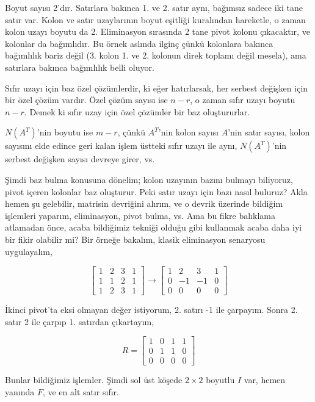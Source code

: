 \documentclass[12pt,fleqn]{article}\usepackage{../../common}
\begin{document}
Boyut sayısı 2'dır. Satırlara bakınca 1. ve 2. satır aynı, bağımsız sadece iki
tane satır var. Kolon ve satır uzaylarının boyut eşitliği kuralından
hareketle, o zaman kolon uzayı boyutu da 2. Eliminasyon sırasında 2 tane
pivot kolonu çıkacaktır, ve kolonlar da bağımlıdır. Bu örnek aslında
ilginç çünkü kolonlara bakınca bağımlılık bariz değil (3. kolon 1. ve
2. kolonun direk toplamı değil mesela), ama satırlara bakınca bağımlılık
belli oluyor.
 
Sıfır uzayı için baz özel çözümlerdir, ki eğer hatırlarsak, her serbest
değişken için bir özel çözüm vardır. Özel çözüm sayısı ise $n-r$, o zaman
sıfır uzayı boyutu $n-r$. Demek ki sıfır uzay için özel çözümler bir baz
oluştururlar. 

$N(A^T)$'nin boyutu ise $m-r$, çünkü $A^T$'nin kolon sayısı $A$'nin satır
sayısı, kolon sayısını elde edince geri kalan işlem üstteki sıfır uzayı ile
aynı, $N(A^T)$'nin serbest değişken sayısı devreye girer, vs. 

Şimdi baz bulma konusuna dönelim; kolon uzayının bazını bulmayı biliyoruz,
pivot içeren kolonlar baz oluşturur. Peki satır uzayı için bazı nasıl
buluruz? Akla hemen şu gelebilir, matrisin devriğini alırım, ve o devrik
üzerinde bildiğim işlemleri yaparım, eliminasyon, pivot bulma, vs. Ama bu
fikre balıklama atlamadan önce, acaba bildiğimiz tekniği olduğu gibi
kullanmak acaba daha iyi bir fikir olabilir mi? Bir örneğe bakalım, klasik
eliminasyon senaryosu uygulayalım,

$$ 
\left[\begin{array}{rrrr}
1 & 2 & 3 & 1 \\
1 & 1 & 2 & 1 \\
1 & 2 & 3 & 1
\end{array}\right] \rightarrow
\left[\begin{array}{rrrr}
1 & 2 & 3 & 1 \\
0 & -1 & -1 & 0 \\
0 & 0 & 0 & 0
\end{array}\right]
 $$

İkinci pivot'ta eksi olmayan değer istiyorum, 2. satırı -1 ile
çarpayım. Sonra 2. satır 2 ile çarpıp 1. satırdan çıkartayım,

$$ R =
\left[\begin{array}{rrrr}
1 & 0 & 1 & 1 \\
0 & 1 & 1 & 0 \\
0 & 0 & 0 & 0
\end{array}\right]
 $$

Bunlar bildiğimiz işlemler. Şimdi sol üst köşede $2 \times 2$ boyutlu $I$ var,
hemen yanında $F$, ve en alt satır sıfır.
\end{document}
